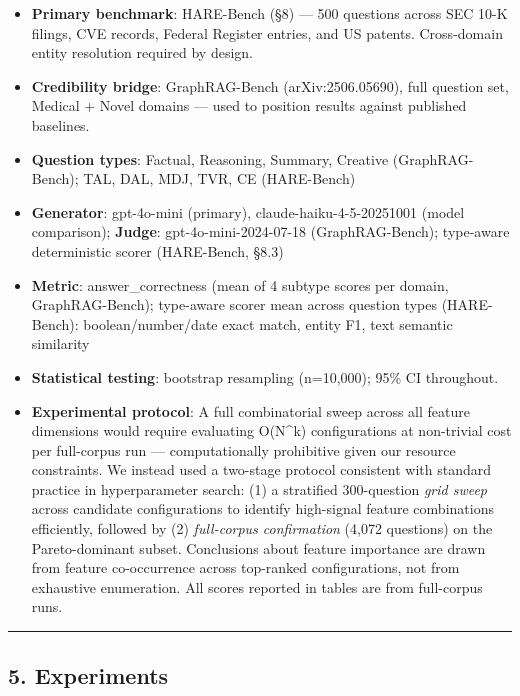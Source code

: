 \begin{itemize}
\tightlist
\item
  \textbf{Primary benchmark}: HARE-Bench (§8) --- 500 questions across SEC 10-K filings, CVE records, Federal Register entries, and US patents. Cross-domain entity resolution required by design.
\item
  \textbf{Credibility bridge}: GraphRAG-Bench (arXiv:2506.05690), full question set, Medical + Novel domains --- used to position results against published baselines.
\item
  \textbf{Question types}: Factual, Reasoning, Summary, Creative (GraphRAG-Bench); TAL, DAL, MDJ, TVR, CE (HARE-Bench)
\item
  \textbf{Generator}: gpt-4o-mini (primary), claude-haiku-4-5-20251001 (model comparison); \textbf{Judge}: gpt-4o-mini-2024-07-18 (GraphRAG-Bench); type-aware deterministic scorer (HARE-Bench, §8.3)
\item
  \textbf{Metric}: answer\_correctness (mean of 4 subtype scores per domain, GraphRAG-Bench); type-aware scorer mean across question types (HARE-Bench): boolean/number/date exact match, entity F1, text semantic similarity
\item
  \textbf{Statistical testing}: bootstrap resampling (n=10,000); 95\% CI throughout.
\item
  \textbf{Experimental protocol}: A full combinatorial sweep across all feature dimensions would require evaluating O(N\^{}k) configurations at non-trivial cost per full-corpus run --- computationally prohibitive given our resource constraints. We instead used a two-stage protocol consistent with standard practice in hyperparameter search: (1) a stratified 300-question \emph{grid sweep} across candidate configurations to identify high-signal feature combinations efficiently, followed by (2) \emph{full-corpus confirmation} (4,072 questions) on the Pareto-dominant subset. Conclusions about feature importance are drawn from feature co-occurrence across top-ranked configurations, not from exhaustive enumeration. All scores reported in tables are from full-corpus runs.
\end{itemize}

\begin{center}\rule{0.5\linewidth}{0.5pt}\end{center}

\subsection{5. Experiments}\label{experiments}


